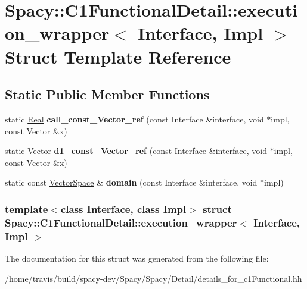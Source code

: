 \hypertarget{structSpacy_1_1C1FunctionalDetail_1_1execution__wrapper}{\section{\-Spacy\-:\-:\-C1\-Functional\-Detail\-:\-:execution\-\_\-wrapper$<$ \-Interface, \-Impl $>$ \-Struct \-Template \-Reference}
\label{structSpacy_1_1C1FunctionalDetail_1_1execution__wrapper}
}
\subsection*{\-Static \-Public \-Member \-Functions}
\begin{DoxyCompactItemize}
\item 
\hypertarget{structSpacy_1_1C1FunctionalDetail_1_1execution__wrapper_aed67f5b9fe148f5137e62334b7018fac}{static \hyperlink{classSpacy_1_1Real}{\-Real} {\bfseries call\-\_\-const\-\_\-\-Vector\-\_\-ref} (const \-Interface \&interface, void $\ast$impl, const \-Vector \&x)}\label{structSpacy_1_1C1FunctionalDetail_1_1execution__wrapper_aed67f5b9fe148f5137e62334b7018fac}

\item 
\hypertarget{structSpacy_1_1C1FunctionalDetail_1_1execution__wrapper_a041305847d2d12e803cc768eddd59b31}{static \-Vector {\bfseries d1\-\_\-const\-\_\-\-Vector\-\_\-ref} (const \-Interface \&interface, void $\ast$impl, const \-Vector \&x)}\label{structSpacy_1_1C1FunctionalDetail_1_1execution__wrapper_a041305847d2d12e803cc768eddd59b31}

\item 
\hypertarget{structSpacy_1_1C1FunctionalDetail_1_1execution__wrapper_acd99119cca0ab049f66f9ec0d4546586}{static const \hyperlink{classSpacy_1_1VectorSpace}{\-Vector\-Space} \& {\bfseries domain} (const \-Interface \&interface, void $\ast$impl)}\label{structSpacy_1_1C1FunctionalDetail_1_1execution__wrapper_acd99119cca0ab049f66f9ec0d4546586}

\end{DoxyCompactItemize}
\subsubsection*{template$<$class Interface, class Impl$>$ struct Spacy\-::\-C1\-Functional\-Detail\-::execution\-\_\-wrapper$<$ Interface, Impl $>$}



\-The documentation for this struct was generated from the following file\-:\begin{DoxyCompactItemize}
\item 
/home/travis/build/spacy-\/dev/\-Spacy/\-Spacy/\-Detail/details\-\_\-for\-\_\-c1\-Functional.\-hh\end{DoxyCompactItemize}
